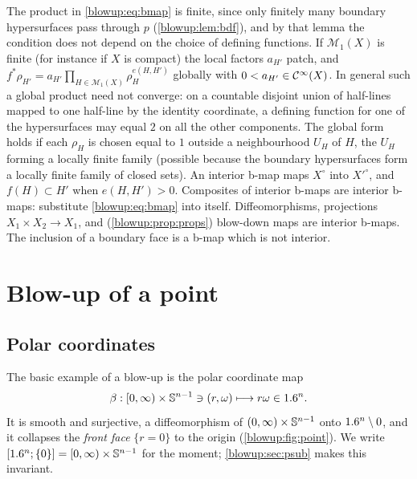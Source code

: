 The product in \eqref{blowup:eq:bmap} is finite, since only finitely many boundary
hypersurfaces pass through $p$ (\cref{blowup:lem:bdf}), and by that lemma the condition
does not depend on the choice of defining functions. If $\mathcal M_1(X)$ is finite (for
instance if $X$ is compact) the local factors $a_{H'}$ patch, and
$f^*\rho_{H'}=a_{H'}\prod_{H\in\mathcal M_1(X)}\rho_H^{e(H,H')}$ globally with $0<a_{H'}\in\mathcal{C}^\infty(X)$.
In general such a global product need not converge: on a countable disjoint union of
half-lines mapped to one half-line by the identity coordinate, a defining function for one
of the hypersurfaces may equal $2$ on all the other components. The global form holds if
each $\rho_H$ is chosen equal to $1$ outside a neighbourhood $U_H$ of $H$, the $U_H$ forming
a locally finite family (possible because the boundary hypersurfaces form a locally finite
family of closed sets). An interior b-map maps $X^\circ$ into $X'^\circ$, and $f(H)\subset H'$ when
$e(H,H')>0$. Composites of interior b-maps are interior b-maps: substitute
\eqref{blowup:eq:bmap} into itself. Diffeomorphisms, projections
$X_1\times X_2\to X_1$, and (\cref{blowup:prop:props}) blow-down maps are interior
b-maps. The inclusion of a boundary face is a b-map which is not interior.

\section{Blow-up of a point}\label{blowup:sec:point}

\subsection{Polar coordinates}
The basic example of a blow-up is the polar coordinate map
\begin{equation*}
  \beta:[0,\infty)\times\mathbb{S}^{n-1}\ni(r,\omega)\longmapsto r\omega\in1.6^n.
\end{equation*}
It is smooth and surjective, a diffeomorphism of $(0,\infty)\times\mathbb{S}^{n-1}$ onto
$1.6^n\setminus0$, and it collapses the \emph{front face} $\{r=0\}$ to the origin
(\cref{blowup:fig:point}). We write $[1.6^n;\{0\}]=[0,\infty)\times\mathbb{S}^{n-1}$ for the
moment; \cref{blowup:sec:psub} makes this invariant.

